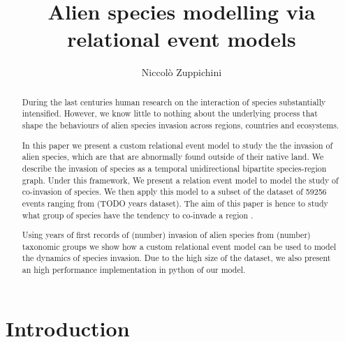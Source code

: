 \documentclass[mscthesis]{usiinfthesis}
\title{Alien species modelling via relational event models} %
\author{Niccol\`o Zuppichini} %
\newcommand\numberevents{59256 }
\begin{document}
\maketitle %

\frontmatter %

\begin{abstract}
During the last centuries human research on the interaction of species substantially intensified. However, we know little to nothing about the underlying process that shape the behaviours of alien species invasion across regions, countries and ecosystems.

In this paper we present a custom relational event model to study the the invasion of alien species, which are that are abnormally found outside of their native land. We describe the invasion of species as a temporal unidirectional bipartite species-region graph. Under this framework, We present a relation event model to model the study of co-invasion of species. We then apply this model to a subset of the dataset of \numberevents events ranging from (TODO years dataset). The aim of this paper is hence to study what group of species have the tendency to co-invade a region
.

Using years of first records of (number) invasion of alien species from (number) taxonomic groups we show how a custom relational event model can be used to model the dynamics of species invasion. Due to the high size of the dataset, we also present an high performance implementation in python of our model.


\end{abstract}



\mainmatter

\chapter{Introduction}
\end{document}
